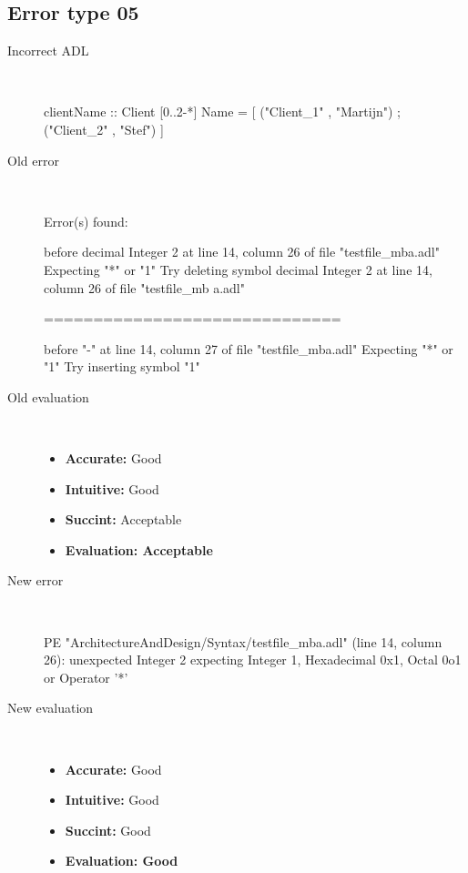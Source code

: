\subsection{Error type 05}
  \begin{description}
  \item[Incorrect ADL]~\\
\begin{adl}
clientName :: Client [0..2-*] Name =
    [ ("Client_1"      , "Martijn")
    ; ("Client_2"      , "Stef")
    ]\end{adl}
  \item[Old error]~\\
\begin{haskell}
Error(s) found:

before decimal Integer 2 at line 14, column 26 of file "testfile_mba.adl"
Expecting "*" or "1"
Try deleting symbol decimal Integer 2 at line 14, column 26 of file "testfile_mb
a.adl"

==============================

before "-" at line 14, column 27 of file "testfile_mba.adl"
Expecting "*" or "1"
Try inserting symbol "1"\end{haskell}
  \item[Old evaluation]~\\
    \begin{itemize}
    \item \textbf{Accurate:} Good
    \item \textbf{Intuitive:} Good
    \item \textbf{Succint:} Acceptable
    \item \textbf{Evaluation: Acceptable}
    \end{itemize}
  \item[New error]~\\
\begin{haskell}
PE "ArchitectureAndDesign/Syntax/testfile_mba.adl" (line 14, column 26):
unexpected Integer 2
expecting Integer 1, Hexadecimal 0x1, Octal 0o1 or Operator '*'\end{haskell}
  \item[New evaluation]~\\
    \begin{itemize}
    \item \textbf{Accurate:} Good
    \item \textbf{Intuitive:} Good
    \item \textbf{Succint:} Good
    \item \textbf{Evaluation: Good
}
    \end{itemize}
  \end{description}

